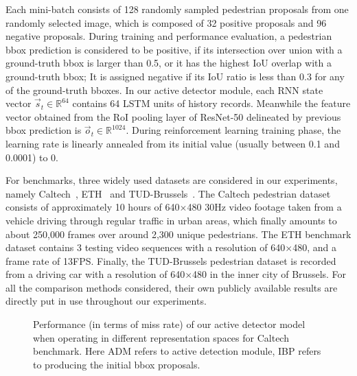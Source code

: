 \documentclass[10pt,journal,compsoc,twoside]{IEEEtran}
\begin{document}
Each mini-batch consists of 128 randomly sampled pedestrian proposals from one randomly selected image, which is composed of 32 positive proposals and 96 negative proposals.
During training and performance evaluation,
a pedestrian bbox prediction is considered to be positive, if its intersection over union with a ground-truth bbox is larger than 0.5, or it has the highest IoU overlap with a ground-truth bbox; It is assigned negative if its IoU ratio is less than 0.3 for any of the ground-truth bboxes.
In our active detector module, each RNN state vector $\vec{s}_t \in \mathbb{R}^{64}$ contains 64 LSTM units of history records. Meanwhile the feature vector obtained from the RoI pooling layer of ResNet-50 delineated by previous bbox prediction is $\vec{o}_t \in \mathbb{R}^{1024}$.
During reinforcement learning training phase, the learning rate is linearly annealed from its initial value (usually between 0.1 and 0.0001) to 0.


For benchmarks, three widely used datasets are considered in our experiments, namely Caltech~\cite{DolEtAl:cvpr09}, ETH~\cite{DolEtAl:bmvc10} and TUD-Brussels~\cite{WojWalSch:cvpr09}.
The Caltech pedestrian dataset consists of approximately 10 hours of 640$\times$480 30Hz video footage taken from a vehicle driving through regular traffic in urban areas,
which finally amounts to about 250,000 frames over around 2,300 unique pedestrians.
The ETH benchmark dataset contains 3 testing video sequences with a resolution of 640$\times$480, and a frame rate of 13FPS.
Finally, the TUD-Brussels pedestrian dataset is recorded from a driving car with a resolution of 640$\times$480 in the inner city of Brussels.
For all the comparison methods considered, their own publicly available results are directly put in use throughout our experiments.




\begin{figure}[!t]
\centering
{}
\caption{Performance (in terms of miss rate) of our active detector model when operating in different representation spaces for Caltech benchmark.
Here ADM refers to active detection module, IBP refers to producing the initial bbox proposals.}
\label{fig_9}
\end{figure}
\end{document}
